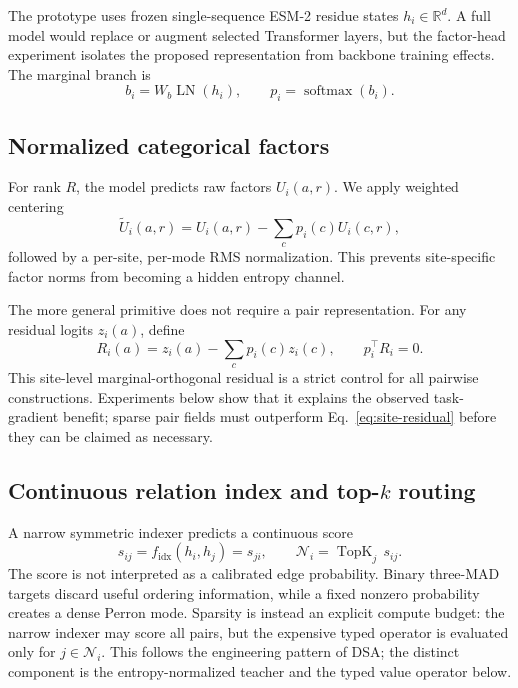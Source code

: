 \documentclass[10pt]{article}
\newcommand{\R}{\mathbb{R}}
\begin{document}
The prototype uses frozen single-sequence ESM-2 residue states $h_i\in\R^d$.  A full model
would replace or augment selected Transformer layers, but the factor-head experiment isolates
the proposed representation from backbone training effects.  The marginal branch is
\begin{equation}
b_i=W_b\operatorname{LN}(h_i),
\qquad p_i=\operatorname{softmax}(b_i).
\end{equation}

\subsection{Normalized categorical factors}

For rank $R$, the model predicts raw factors $U_i(a,r)$.  We apply weighted centering
\begin{equation}
\widetilde U_i(a,r)
=U_i(a,r)-\sum_c p_i(c)U_i(c,r),
\end{equation}
followed by a per-site, per-mode RMS normalization.  This prevents site-specific factor norms
from becoming a hidden entropy channel.

The more general primitive does not require a pair representation.  For any residual logits
$z_i(a)$, define
\begin{equation}
R_i(a)=z_i(a)-\sum_c p_i(c)z_i(c),\qquad p_i^\top R_i=0.
\label{eq:site-residual}
\end{equation}
This site-level marginal-orthogonal residual is a strict control for all pairwise constructions.
Experiments below show that it explains the observed task-gradient benefit; sparse pair fields
must outperform Eq.~\ref{eq:site-residual} before they can be claimed as necessary.

\subsection{Continuous relation index and \texorpdfstring{top-$k$}{top-k} routing}

A narrow symmetric indexer predicts a continuous score
\begin{equation}
s_{ij}=f_{\mathrm{idx}}(h_i,h_j)=s_{ji},\qquad
\mathcal N_i=\operatorname{TopK}_{j}\,s_{ij}.
\label{eq:indexer}
\end{equation}
The score is not interpreted as a calibrated edge probability.  Binary three-MAD targets
discard useful ordering information, while a fixed nonzero probability creates a dense Perron
mode.  Sparsity is instead an explicit compute budget: the narrow indexer may score all pairs,
but the expensive typed operator is evaluated only for $j\in\mathcal N_i$.  This follows the
engineering pattern of DSA; the distinct component is the entropy-normalized teacher and the
typed value operator below.
\end{document}
